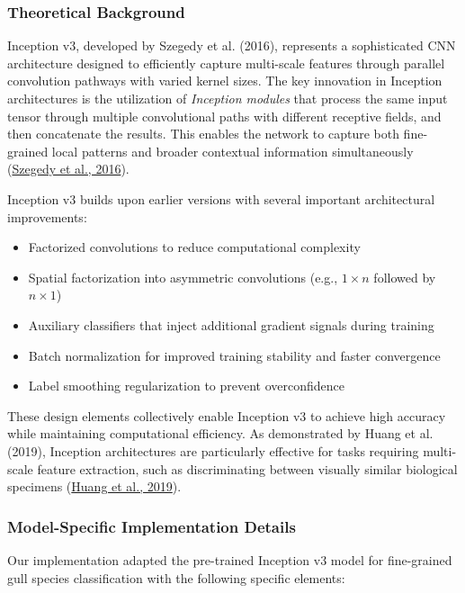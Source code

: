 \documentclass[a4paper,12pt]{article}
\begin{document}
\subsubsection{Theoretical Background}

Inception v3, developed by Szegedy et al. (2016), represents a sophisticated CNN architecture designed to efficiently capture multi-scale features through parallel convolution pathways with varied kernel sizes. The key innovation in Inception architectures is the utilization of \textit{Inception modules} that process the same input tensor through multiple convolutional paths with different receptive fields, and then concatenate the results. This enables the network to capture both fine-grained local patterns and broader contextual information simultaneously (\href{https://arxiv.org/abs/1512.00567}{Szegedy et al., 2016}).

Inception v3 builds upon earlier versions with several important architectural improvements:
\begin{itemize}
    \item Factorized convolutions to reduce computational complexity
    \item Spatial factorization into asymmetric convolutions (e.g., $1 \times n$ followed by $n \times 1$)
    \item Auxiliary classifiers that inject additional gradient signals during training
    \item Batch normalization for improved training stability and faster convergence
    \item Label smoothing regularization to prevent overconfidence
\end{itemize}

These design elements collectively enable Inception v3 to achieve high accuracy while maintaining computational efficiency. As demonstrated by Huang et al. (2019), Inception architectures are particularly effective for tasks requiring multi-scale feature extraction, such as discriminating between visually similar biological specimens (\href{https://ieeexplore.ieee.org/document/8803812}{Huang et al., 2019}).

\subsubsection{Model-Specific Implementation Details}

Our implementation adapted the pre-trained Inception v3 model for fine-grained gull species classification with the following specific elements:
\end{document}
